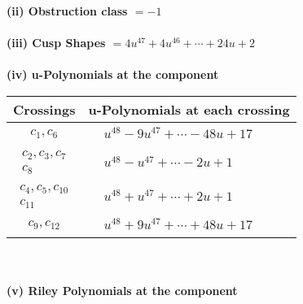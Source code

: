 \documentclass[1p]{elsarticle_modified}
\theoremstyle{definition}
\begin{document}
\flushleft \textbf{(ii) Obstruction class $= -1$}\\~\\
\flushleft \textbf{(iii) Cusp Shapes $= 4 u^{47}+4 u^{46}+\cdots+24 u+2$}\\~\\
\newpage\renewcommand{\arraystretch}{1}
\flushleft \textbf{(iv) u-Polynomials at the component}\newline \\
\begin{tabular}{m{50pt}|m{274pt}}
Crossings & \hspace{64pt}u-Polynomials at each crossing \\
\hline $$\begin{aligned}c_{1},c_{6}\end{aligned}$$&$\begin{aligned}
&u^{48}-9 u^{47}+\cdots-48 u+17
\end{aligned}$\\
\hline $$\begin{aligned}c_{2},c_{3},c_{7}\\c_{8}\end{aligned}$$&$\begin{aligned}
&u^{48}- u^{47}+\cdots-2 u+1
\end{aligned}$\\
\hline $$\begin{aligned}c_{4},c_{5},c_{10}\\c_{11}\end{aligned}$$&$\begin{aligned}
&u^{48}+u^{47}+\cdots+2 u+1
\end{aligned}$\\
\hline $$\begin{aligned}c_{9},c_{12}\end{aligned}$$&$\begin{aligned}
&u^{48}+9 u^{47}+\cdots+48 u+17
\end{aligned}$\\
\hline
\end{tabular}\\~\\
\newpage\renewcommand{\arraystretch}{1}
\flushleft \textbf{(v) Riley Polynomials at the component}\newline \\
\end{document}

